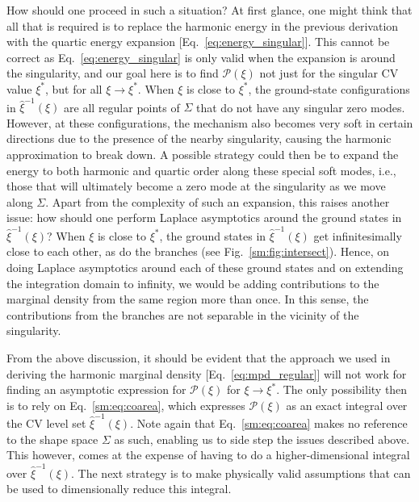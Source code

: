 How should one proceed in such a situation?
At first glance, one might think that all that is required is to replace the harmonic energy in the previous derivation with the quartic energy expansion [Eq.~\eqref{eq:energy_singular}].
This cannot be correct as Eq.~\eqref{eq:energy_singular} is only valid when the expansion is around the singularity, and our goal here is to find $\mathscr{P}(\xi)$ not just for the singular CV value $\xi^{*}$, but for all $\xi \to \xi^{*}$.
When $\xi$ is close to $\xi^{*}$, the ground-state configurations in $\hat{\xi}^{-1}(\xi)$ are all regular points of $\Sigma$ that do not have any singular zero modes.
However, at these configurations, the mechanism also becomes very soft in certain directions due to the presence of the nearby singularity, causing the harmonic approximation to break down.
A possible strategy could then be to expand the energy to both harmonic and quartic order along these special soft modes, i.e., those that will ultimately become a zero mode at the singularity as we move along $\Sigma$.
Apart from the complexity of such an expansion, this raises another issue: how should one perform Laplace asymptotics around the ground states in $\hat{\xi}^{-1}(\xi)$?
When $\xi$ is close to $\xi^{*}$, the ground states in $\hat{\xi}^{-1}(\xi)$ get infinitesimally close to each other, as do the branches (see Fig.~\ref{sm:fig:intersect}).
Hence, on doing Laplace asymptotics around each of these ground states and on extending the integration domain to infinity, we would be adding contributions to the marginal density from the same region more than once.
In this sense, the contributions from the branches are not separable in the vicinity of the singularity.

From the above discussion, it should be evident that the approach we used in deriving the harmonic marginal density [Eq.~\eqref{eq:mpd_regular}] will not work for finding an asymptotic expression for $\mathscr{P}(\xi)$ for $\xi \to \xi^{*}$.
The only possibility then is to rely on Eq.~\eqref{sm:eq:coarea}, which expresses $\mathscr{P}(\xi)$ as an exact integral over the CV level set $\hat{\xi}^{-1}(\xi)$.
Note again that Eq.~\eqref{sm:eq:coarea} makes no reference to the shape space $\Sigma$ as such, enabling us to side step the issues described above.
This however, comes at the expense of having to do a higher-dimensional integral over $\hat{\xi}^{-1}(\xi)$.
The next strategy is to make physically valid assumptions that can be used to dimensionally reduce this integral.

